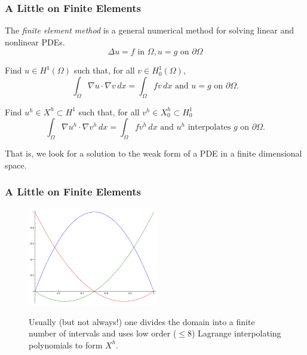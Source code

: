 \documentclass[8pt]{beamer}
\begin{document}
\begin{frame}
    \frametitle{A Little on Finite Elements}

    The \emph{finite element method} is a general numerical method for solving
    linear and nonlinear PDEs.
    \pause
    \begin{equation}
        \Delta u = f \text{ in } \Omega, u = g \text{ on } \partial \Omega
    \end{equation}
    \pause
    \begin{center}
        Find \(u \in H^1(\Omega)\) such that, for all \(v \in H_0^1(\Omega)\),
        \begin{equation}
            \int_\Omega \nabla u \cdot \nabla v \,dx = \int_\Omega f v \,dx
            \text{ and }
            u = g \text{ on } \partial\Omega.
        \end{equation}
    \end{center}
    \pause
    \begin{center}
        Find \(u^h \in X^h \subset H^1\) such that, for all \(v^h \in X_0^h
        \subset H^1_0\)
        \begin{equation}
            \int_\Omega \nabla u^h \cdot \nabla v^h \,dx = \int_\Omega f v^h \,dx
            \text{ and }
            u^h \text{ interpolates } g \text{ on } \partial\Omega.
        \end{equation}
    \end{center}
    That is, we look for a solution to the weak form of a PDE in a finite
    dimensional space.
\end{frame}

\begin{frame}
    \frametitle{A Little on Finite Elements}

    \begin{figure}
        \centering

        \includegraphics[width=2.25in]{lagrange-quadratics}

        Usually (but not always!) one divides the domain into a finite number of
        intervals and uses low order (\(\leq 8\)) Lagrange interpolating
        polynomials to form \(X^h\).
    \end{figure}
\end{frame}
\end{document}
